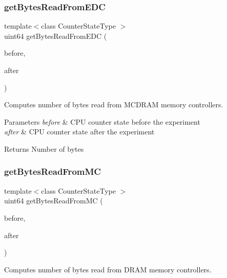 \subsubsection{get\+Bytes\+Read\+From\+E\+DC}
{\footnotesize\ttfamily template$<$class Counter\+State\+Type $>$ \\
uint64 get\+Bytes\+Read\+From\+E\+DC (\begin{DoxyParamCaption}\item[{const Counter\+State\+Type \&}]{before,  }\item[{const Counter\+State\+Type \&}]{after }\end{DoxyParamCaption})\hspace{0.3cm}{\ttfamily [friend]}}



Computes number of bytes read from M\+C\+D\+R\+AM memory controllers. 


\begin{DoxyParams}{Parameters}
{\em before} & C\+PU counter state before the experiment \\
\hline
{\em after} & C\+PU counter state after the experiment \\
\hline
\end{DoxyParams}
\begin{DoxyReturn}{Returns}
Number of bytes 
\end{DoxyReturn}
\mbox{\label{classUncoreCounterState_a0f28a32a3edeaecd916ba097aee99d7f}} 
\subsubsection{get\+Bytes\+Read\+From\+MC}
{\footnotesize\ttfamily template$<$class Counter\+State\+Type $>$ \\
uint64 get\+Bytes\+Read\+From\+MC (\begin{DoxyParamCaption}\item[{const Counter\+State\+Type \&}]{before,  }\item[{const Counter\+State\+Type \&}]{after }\end{DoxyParamCaption})\hspace{0.3cm}{\ttfamily [friend]}}



Computes number of bytes read from D\+R\+AM memory controllers. 


